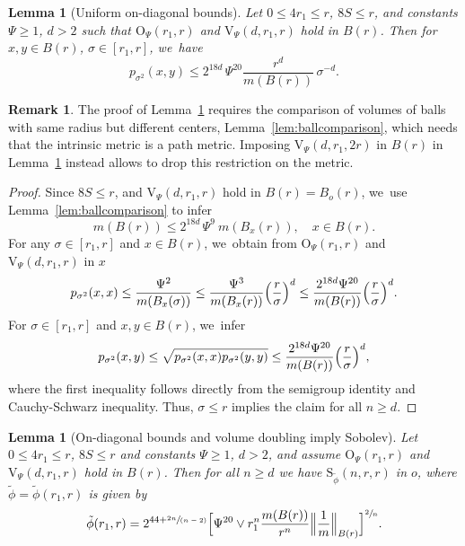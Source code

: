 \documentclass[JEP,XML,SOM,Unicode,published]{cedram}
\newcommand{\spfrac}[2]{\sfrac{#1}{(#2)}}
\newcommand{\rS}{\mathrm{S}}
\newcommand{\rV}{\mathrm{V}}
\newcommand{\rO}{\mathrm{O}}
\theoremstyle{plain}
\newtheorem{lemma}[theorem]{Lemma}
\theoremstyle{definition}
\newtheorem*{remark}{Remark}
\begin{document}
\begin{lemma}[Uniform on-diagonal bounds]\label{lem:heattosob}
Let
$0\leq {4}r_1\leq r$, $8S\leq r$, and constants $\Psi\geq 1$, $d>2$ such that $\rO_\Psi(r_1,r)$
and $\rV_\Psi (d,r_1,r)$ hold in $B(r)$.
Then for $x,y\in B(r)$, $\sigma\in[r_1,r]$, we~have
\[
p_{\sigma^2}(x,y)
\leq
2^{18d}\,\Psi^{20}
\frac{r^{d}}{m(B(r))}\,\sigma^{-{d}}.
\]
\end{lemma}
\begin{remark}The proof of Lemma~\ref{lem:heattosob} requires the comparison of volumes of balls with same radius but different centers, Lemma~\ref{lem:ballcomparison}, which needs that the intrinsic metric is a path metric. Imposing $\rV_\Psi (d,r_1,2r)$ in $B(r)$ in Lemma~\ref{lem:heattosob} instead allows to drop this restriction on the metric.
\end{remark}
\begin{proof} Since $8S\leq r$,
and $\rV_\Psi (d,r_1,r)$ hold in $B(r)=B_o(r)$, we~use Lemma~\ref{lem:ballcomparison} to infer
\[
m(B(r))\leq 2^{18d}\,\Psi^9\ m(B_x(r)), \quad x\in B(r).
\]
For any $\sigma\in[r_1,r]$ and $x\in B(r)$, we~obtain from $\rO_{\Psi}(r_1,r)$ and $\rV_\Psi (d, r_1,r)$ in $x$
\begin{align*}
p_{\sigma^{2}}(x,x)\leq \frac{\Psi^2}{m(B_x(\sigma))}
\leq
\frac{\Psi^3 }{m(B_x(r))}\Bigl(\frac{r}{\sigma}\Bigr)^{d}
\leq
\frac{2^{18d}\Psi^{20}}{m(B(r))} \Bigl(\frac{r}{\sigma}\Bigr)^{{d}}.
\end{align*}
For $\sigma\in[r_1,r]$ and $x,y\in B(r)$, we~infer
\[
p_{\sigma^2}(x,y)\leq \sqrt{p_{\sigma^2}(x,x)p_{\sigma^2}(y,y)}
\leq
\frac{2^{18d}\Psi^{20}}{m(B(r))}\Bigl(\frac{r}{\sigma}\Bigr)^{{d}},
\]
where the first inequality follows directly from the semigroup identity and Cauchy-Schwarz inequality.
Thus, $\sigma\leq r$ implies the claim for all $n\geq d$.
\end{proof}

\begin{lemma}[On-diagonal bounds and volume doubling imply Sobolev]\label{lem:heattosob3}
Let
$0\leq {4} r_1\leq r$, $8S\leq r$ and constants $\Psi\geq 1$, $d>2$, and assume $\rO_\Psi(r_1,r)$ and
$\rV_\Psi (d,r_1,r)$ hold in $B(r)$.
Then for all $n\geq d$ we have $\rS_{\tilde \phi}(n,r,r)$ in $o$, where $\tilde \phi =\tilde \phi(r_1,r) $ is given by
\[
\tilde \phi(r_1,r)=2^{44+\spfrac{2n}{n-2}}
\Bigl[\Psi^{20}\vee r_1^n\frac{m(B(r))}{r^{n}}\Bigl\Vert\frac1m\Bigr\Vert_{B(r)}\Bigr]^{\sfrac{2}{n}}.
\]
\end{lemma}
\end{document}
